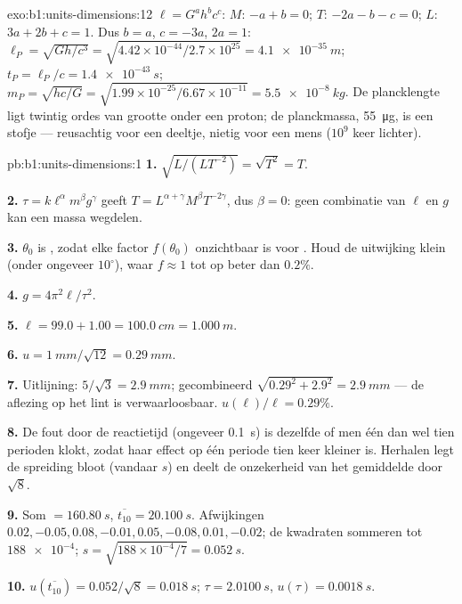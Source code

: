 \begin{solution}{exo:b1:units-dimensions:12}
$\ell = G^a h^b c^c$: $M$: $-a + b = 0$; $T$: $-2a - b - c = 0$; $L$:
$3a + 2b + c = 1$. Dus $b = a$, $c = -3a$, $2a = 1$:
$\ell_P = \sqrt{Gh/c^3} = \sqrt{4.42\times10^{-44}/2.7\times10^{25}}
= \qty{4.1e-35}{m}$; $t_P = \ell_P/c = \qty{1.4e-43}{s}$;
$m_P = \sqrt{hc/G} = \sqrt{1.99\times10^{-25}/6.67\times10^{-11}}
= \qty{5.5e-8}{kg}$. De plancklengte ligt twintig ordes van grootte
onder een proton; de planckmassa, \qty{55}{\micro g}, is een stofje
--- reusachtig voor een deeltje, nietig voor een mens ($10^9$ keer lichter).
\end{solution}

\begin{solution}{pb:b1:units-dimensions:1}
\textbf{1.} $\sqrt{L/(L T^{-2})} = \sqrt{T^2} = T$.

\textbf{2.} $\tau = k\ell^\alpha m^\beta g^\gamma$ geeft
$T = L^{\alpha+\gamma} M^\beta T^{-2\gamma}$, dus $\beta = 0$: geen
combinatie van $\ell$ en $g$ kan een massa wegdelen.

\textbf{3.} $\theta_0$ is , zodat elke factor $f(\theta_0)$
onzichtbaar is voor . Houd de uitwijking klein (onder ongeveer
$10^\circ$), waar $f \approx 1$ tot op beter dan $0.2\%$.

\textbf{4.} $g = 4\pi^2\ell/\tau^2$.

\textbf{5.} $\ell = 99.0 + 1.00 = \qty{100.0}{cm} = \qty{1.000}{m}$.

\textbf{6.} $u = \qty{1}{mm}/\sqrt{12} = \qty{0.29}{mm}$.

\textbf{7.} Uitlijning: $5/\sqrt3 = \qty{2.9}{mm}$; gecombineerd
$\sqrt{0.29^2 + 2.9^2} = \qty{2.9}{mm}$ --- de aflezing op het lint is
verwaarloosbaar. $u(\ell)/\ell = 0.29\%$.

\textbf{8.} De fout door de reactietijd (ongeveer \qty{0.1}{s}) is dezelfde
of men één dan wel tien perioden klokt, zodat haar effect op één periode
tien keer kleiner is. Herhalen legt de spreiding bloot (vandaar $s$) en
deelt de onzekerheid van het gemiddelde door $\sqrt8$.

\textbf{9.} Som $= \qty{160.80}{s}$, $\overline{t_{10}} = \qty{20.100}{s}$.
Afwijkingen $0.02, -0.05, 0.08, -0.01, 0.05, -0.08, 0.01, -0.02$; de kwadraten
sommeren tot $\num{188e-4}$; $s = \sqrt{188\times10^{-4}/7} = \qty{0.052}{s}$.

\textbf{10.} $u(\overline{t_{10}}) = 0.052/\sqrt8 = \qty{0.018}{s}$;
$\tau = \qty{2.0100}{s}$, $u(\tau) = \qty{0.0018}{s}$.


\end{solution}
